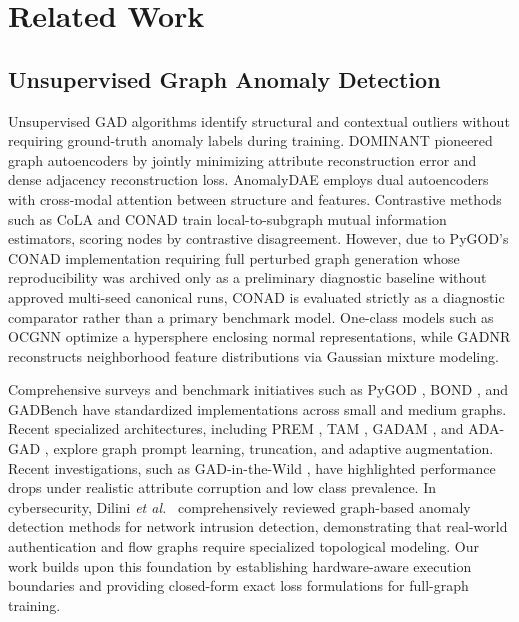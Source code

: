 \documentclass[11pt,a4paper]{article}
\newcommand{\etal}{\emph{et al.}}
\begin{document}
\section{Related Work}
\label{sec:related}

\subsection{Unsupervised Graph Anomaly Detection}
Unsupervised GAD algorithms identify structural and contextual outliers without requiring ground-truth anomaly labels during training. DOMINANT \cite{ding2019deep} pioneered graph autoencoders by jointly minimizing attribute reconstruction error and dense adjacency reconstruction loss. AnomalyDAE \cite{fan2020anomalydae} employs dual autoencoders with cross-modal attention between structure and features. Contrastive methods such as CoLA \cite{liu2022cola} and CONAD \cite{xu2022conad} train local-to-subgraph mutual information estimators, scoring nodes by contrastive disagreement. However, due to PyGOD's CONAD implementation requiring full perturbed graph generation whose reproducibility was archived only as a preliminary diagnostic baseline without approved multi-seed canonical runs, CONAD is evaluated strictly as a diagnostic comparator rather than a primary benchmark model. One-class models such as OCGNN \cite{wang2021ocgnn} optimize a hypersphere enclosing normal representations, while GADNR \cite{roy2024gadnr} reconstructs neighborhood feature distributions via Gaussian mixture modeling. 

Comprehensive surveys \cite{ma2023survey,qiao2025survey} and benchmark initiatives such as PyGOD \cite{liu2024pygod}, BOND \cite{liu2022bond}, and GADBench \cite{tang2023gadbench} have standardized implementations across small and medium graphs. Recent specialized architectures, including PREM \cite{pan2023prem}, TAM \cite{qiao2023tam}, GADAM \cite{chen2024gadam}, and ADA-GAD \cite{he2024adag}, explore graph prompt learning, truncation, and adaptive augmentation. Recent investigations, such as GAD-in-the-Wild \cite{zhou2026wild}, have highlighted performance drops under realistic attribute corruption and low class prevalence. In cybersecurity, Dilini \etal\ \cite{dilini2026comprehensive} comprehensively reviewed graph-based anomaly detection methods for network intrusion detection, demonstrating that real-world authentication and flow graphs require specialized topological modeling. Our work builds upon this foundation by establishing hardware-aware execution boundaries and providing closed-form exact loss formulations for full-graph training.
\end{document}
